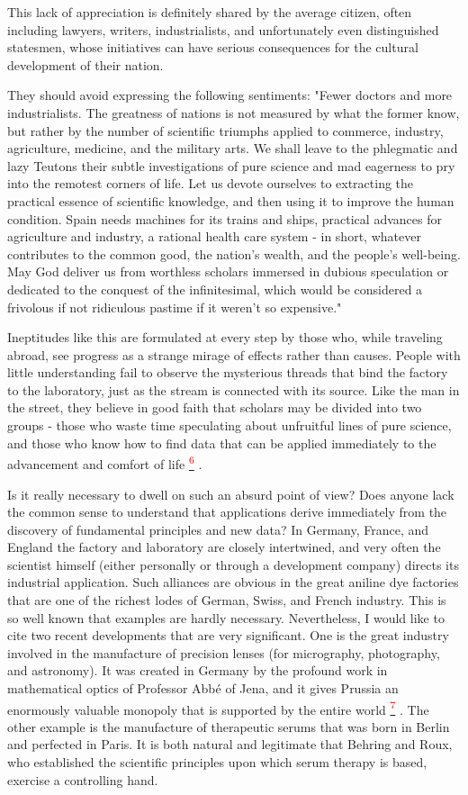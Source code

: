 \documentclass{article}
\newcommand{\noteref}[1]{%
 \hypertarget{ref:#1}{}%
 \hyperlink{note:#1}{\textsuperscript{\textcolor{red}{#1}}}%
}
\begin{document}
This lack of appreciation is definitely shared by the average citizen, often including lawyers, writers, industrialists, and unfortunately even distinguished statesmen, whose initiatives can have serious consequences for the cultural development of their nation.

They should avoid expressing the following sentiments: "Fewer doctors and more industrialists. The greatness of nations is not measured by what the former know, but rather by the number of scientific triumphs applied to commerce, industry, agriculture, medicine, and the military arts. We shall leave to the phlegmatic and lazy Teutons their subtle investigations of pure science and mad eagerness to pry into the remotest corners of life. Let us devote ourselves to extracting the practical essence of scientific knowledge, and then using it to improve the human condition. Spain needs machines for its trains and ships, practical advances for agriculture and industry, a rational health care system - in short, whatever contributes to the common good, the nation’s wealth, and the people’s well-being. May God deliver us from worthless scholars immersed in dubious speculation or dedicated to the conquest of the infinitesimal, which would be considered a frivolous if not ridiculous pastime if it weren’t so expensive."

Ineptitudes like this are formulated at every step by those who, while traveling abroad, see progress as a strange mirage of effects rather than causes. People with little understanding fail to observe the mysterious threads that bind the factory to the laboratory, just as the stream is connected with its source. Like the man in the street, they believe in good faith that scholars may be divided into two groups - those who waste time speculating about unfruitful lines of pure science, and those who know how to find data that can be applied immediately to the advancement and comfort of life\noteref{6}.

Is it really necessary to dwell on such an absurd point of view? Does anyone lack the common sense to understand that applications derive immediately from the discovery of fundamental principles and new data? In Germany, France, and England the factory and laboratory are closely intertwined, and very often the scientist himself (either personally or through a development company) directs its industrial application. Such alliances are obvious in the great aniline dye factories that are one of the richest lodes of German, Swiss, and French industry. This is so well known that examples are hardly necessary. Nevertheless, I would like to cite two recent developments that are very significant. One is the great industry involved in the manufacture of precision lenses (for micrography, photography, and astronomy). It was created in Germany by the profound work in mathematical optics of Professor Abbé of Jena, and it gives Prussia an enormously valuable monopoly that is supported by the entire world\noteref{7}. The other example is the manufacture of therapeutic serums that was born in Berlin and perfected in Paris. It is both natural and legitimate that Behring and Roux, who established the scientific principles upon which serum therapy is based, exercise a controlling hand.
\end{document}
